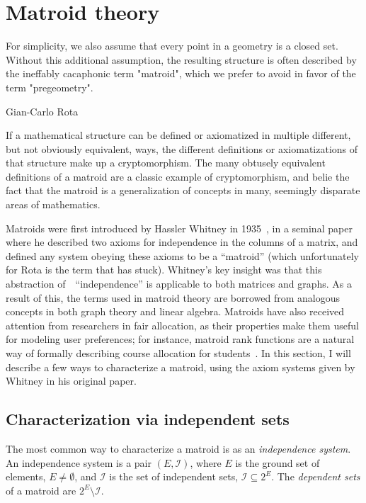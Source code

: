 \section{Matroid theory}
\epigraph{For simplicity, we also assume that every point in a geometry is a closed set. Without this additional assumption, the resulting structure is often described by the ineffably cacaphonic term "matroid", which we prefer to avoid in favor of the term "pregeometry".}{Gian-Carlo Rota \cite{crapo_rota_1970}}
\label{sec:matroid-theory}

If a mathematical structure can be defined or axiomatized in multiple different, but not obviously equivalent, ways, the different definitions or axiomatizations of that structure make up a cryptomorphism. The many obtusely equivalent definitions of a matroid are a classic example of cryptomorphism, and belie the fact that the matroid is a generalization of concepts in many, seemingly disparate areas of mathematics.

Matroids were first introduced by Hassler Whitney in 1935~\cite{whitney-1935}, in a seminal paper where he described two axioms for independence in the columns of a matrix, and defined any system obeying these axioms to be a ``matroid'' (which unfortunately for Rota is the term that has stuck). Whitney's key insight was that this abstraction of~~``independence'' is applicable to both matrices and graphs. As a result of this, the terms used in matroid theory are borrowed from analogous concepts in both graph theory and linear algebra. Matroids have also received attention from researchers in fair allocation, as their properties make them useful for modeling user preferences; for instance, matroid rank functions are a natural way of formally describing course allocation for students~\cite{benabbou-2021}. In this section, I will describe a few ways to characterize a matroid, using the axiom systems given by Whitney in his original paper.

\subsection{Characterization via independent sets} The most common way to characterize a matroid is as an \textit{independence system}. An independence system is a pair $(E, \mathcal{I})$, where $E$ is the ground set of elements, $E \not= \emptyset$, and $\mathcal{I}$ is the set of independent sets, $\mathcal{I} \subseteq 2^E$. The \textit{dependent sets} of a matroid are $2^E \setminus \mathcal{I}$. 

